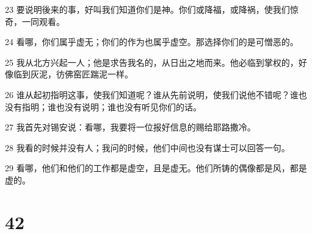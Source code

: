 \par 23 要说明後来的事，好叫我们知道你们是神。你们或降福，或降祸，使我们惊奇，一同观看。
\par 24 看哪，你们属乎虚无；你们的作为也属乎虚空。那选择你们的是可憎恶的。
\par 25 我从北方兴起一人；他是求告我名的，从日出之地而来。他必临到掌权的，好像临到灰泥，彷佛窑匠踹泥一样。
\par 26 谁从起初指明这事，使我们知道呢？谁从先前说明，使我们说他不错呢？谁也没有指明；谁也没有说明；谁也没有听见你们的话。
\par 27 我首先对锡安说：看哪，我要将一位报好信息的赐给耶路撒冷。
\par 28 我看的时候并没有人；我问的时候，他们中间也没有谋士可以回答一句。
\par 29 看哪，他们和他们的工作都是虚空，且是虚无。他们所铸的偶像都是风，都是虚的。

\chapter{42}

